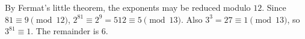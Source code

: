 By Fermat's little theorem, the exponents may be reduced modulo $12$. Since $81\equiv9\pmod{12}$, $2^{81}\equiv2^9=512\equiv5\pmod{13}$. Also $3^3=27\equiv1\pmod{13}$, so $3^{81}\equiv1$. The remainder is $\boxed6$.
